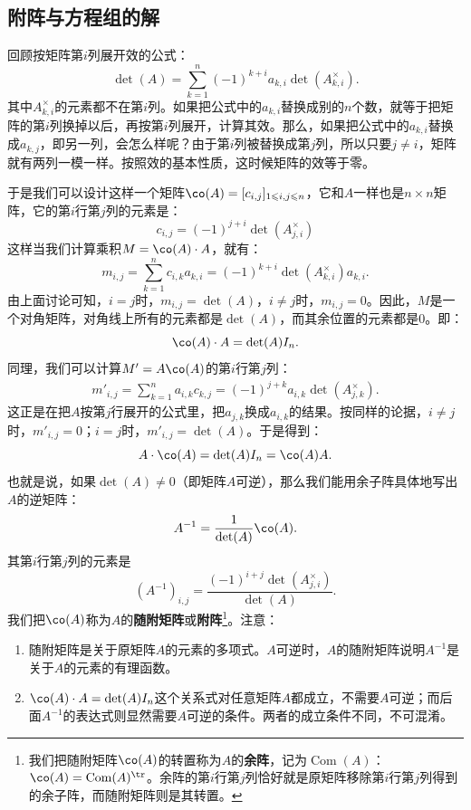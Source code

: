 \documentclass[12pt,UTF8]{ctexbook}
\begin{document}
\subsection{附阵与方程组的解}

回顾按矩阵第$i$列展开效的公式：
$$
\det(A) = \sum_{k=1}^n (-1)^{k+i} a_{k,i} \det(A_{k,i}^{\times}).
$$
其中$A_{k,i}^{\times}$的元素都不在第$i$列。如果把公式中的$a_{k,i}$替换成别的$n$个数，就等于把矩阵的第$i$列换掉以后，再按第$i$列展开，计算其效。那么，如果把公式中的$a_{k,i}$替换成$a_{k,j}$，即另一列，会怎么样呢？由于第$i$列被替换成第$j$列，所以只要$j\neq i$，矩阵就有两列一模一样。按照效的基本性质，这时候矩阵的效等于零。

于是我们可以设计这样一个矩阵$\co(A) = [c_{i,j}]_{1\leqslant i,j\leqslant n}$，它和$A$一样也是$n\times n$矩阵，它的第$i$行第$j$列的元素是：
$$
c_{i,j} = (-1)^{j+i} \det(A_{j,i}^{\times})
$$
这样当我们计算乘积$M = \co(A)\cdot A$，就有：
$$
m_{i,j} = \sum_{k=1}^n c_{i,k} a_{k,i} = (-1)^{k+i} \det(A_{k,i}^{\times}) a_{k,i}.
$$
由上面讨论可知，$i=j$时，$m_{i,j} = \det(A)$，$i\neq j$时，$m_{i,j} = 0$。因此，$M$是一个对角矩阵，对角线上所有的元素都是$\det(A)$，而其余位置的元素都是$0$。即：
$$
\co(A)\cdot A = \det(A)I_n.
$$
同理，我们可以计算$M' = A\co(A)$的第$i$行第$j$列：
\begin{align*}
    m'_{i,j} = \sum_{k=1}^n a_{i,k} c_{k,j} = (-1)^{j+k}a_{i,k} \det(A_{j,k}^{\times}) .
\end{align*}
这正是在把$A$按第$j$行展开的公式里，把$a_{j,k}$换成$a_{i,k}$的结果。按同样的论据，$i\neq j$时，$m'_{i,j}=0$；$i=j$时，$m'_{i,j} = \det(A)$。于是得到：
$$
A\cdot \co(A) = \det(A)I_n = \co(A)A.
$$
也就是说，如果$\det(A)\neq 0$（即矩阵$A$可逆），那么我们能用余子阵具体地写出$A$的逆矩阵：
$$
A^{-1} = \frac{1}{\det(A)}\co(A).
$$
其第$i$行第$j$列的元素是
$$\left(A^{-1}\right)_{i,j} = \frac{(-1)^{i+j} \det(A_{j,i}^{\times})}{\det(A)}.$$
我们把$\co(A)$称为$A$的\textbf{随附矩阵}或\textbf{附阵}\footnote{我们把随附矩阵$\co(A)$的转置称为$A$的\textbf{余阵}，记为$\operatorname{Com}(A)$：$\co(A) = \operatorname{Com}(A)^{\tr}$。余阵的第$i$行第$j$列恰好就是原矩阵移除第$i$行第$j$列得到的余子阵，而随附矩阵则是其转置。}。注意：
\begin{enumerate}
    \item 随附矩阵是关于原矩阵$A$的元素的多项式。$A$可逆时，$A$的随附矩阵说明$A^{-1}$是关于$A$的元素的有理函数。
    \item $\co(A)\cdot A = \det(A)I_n$这个关系式对任意矩阵$A$都成立，不需要$A$可逆；而后面$A^{-1}$的表达式则显然需要$A$可逆的条件。两者的成立条件不同，不可混淆。
\end{enumerate}
\end{document}
